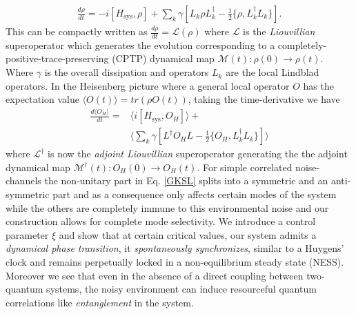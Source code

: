 \documentclass[aps,pra,reprint,amsmath,amssymb]{revtex4-2}
\begin{document}
\begin{align}
\label{GKSL}
    \frac{d\rho}{dt} =-i [H_{\text{sys}},\rho]+ \sum_k \gamma\left[ L_k \rho L_k^\dagger - \frac{1}{2}\{\rho,L_k^\dagger L_k\}\right].
\end{align}
This can be compactly written as 
$\frac{d\rho}{dt} = \mathcal{L}(\rho)$ where $\mathcal{L}$ is the {\it Liouvillian} superoperator which generates the evolution corresponding to a completely-positive-trace-preserving (CPTP) \cite{lindblad1976generators} dynamical map $\mathcal{M}(t):\rho(0) \rightarrow \rho(t)$.
Where $\gamma$ is the overall dissipation and operators $L_k$ are the local Lindblad operators.
In the Heisenberg picture 
where a general local operator $O$ has the expectation value
$\langle O(t) \rangle = tr\left(\rho O(t) \right)$, taking the time-derivative we have 
\begin{align}
    \frac{d \langle O_H \rangle}{dt}
    = &\langle i[H_{\text{sys}},O_H] \rangle + \nonumber\\
    &\langle \sum_k \gamma \left[ L^\dagger O_H L - \frac{1}2{}\{O_H,L^\dagger_k L_k\}\right]\rangle
\end{align}
where $\mathcal{L}^\dagger$ is now the {\it adjoint Liouvillian} superoperator generating the the adjoint dynamical map $\mathcal{M}^\dagger(t):O_H(0)\rightarrow O_H(t)$. For simple correlated noise-channels the non-unitary part in Eq. \eqref{GKSL} splits into a symmetric and an anti-symmetric part and as a consequence only affects certain modes of the system while the others are completely immune to this environmental noise and our construction allows for complete mode selectivity. We introduce a control parameter $\xi$ and show that at certain critical values, our system admits a {\it dynamical phase transition}, it {\it spontaneously synchronizes}, similar to a Huygens' clock \cite{huygens1999instructions} and remains perpetually locked in a non-equilibrium steady state (NESS).  Moreover we see that even in the absence of a direct coupling between two-quantum systems, the noisy environment can induce resourceful quantum correlations like {\it entanglement} in the system. 
\end{document}

